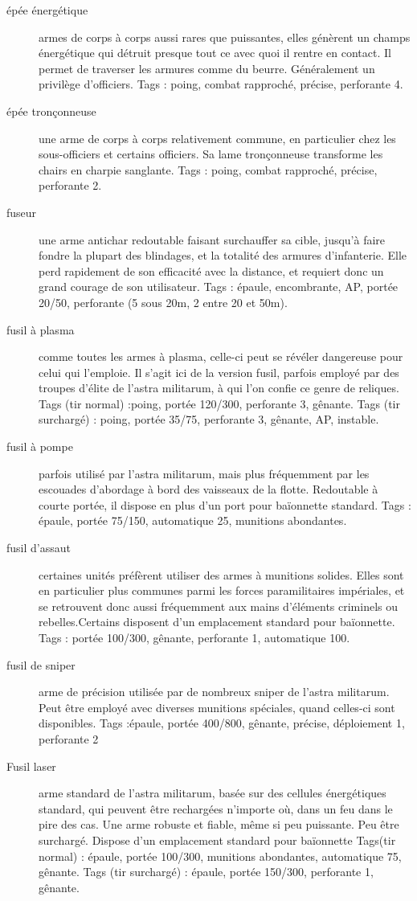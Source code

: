 \documentclass[10pt,a4paper]{article}
\begin{document}
\begin{description}
\item[épée énergétique]armes de corps à corps aussi rares que puissantes, elles génèrent un champs énergétique qui détruit presque tout ce avec quoi il rentre en contact. Il permet de traverser les armures comme du beurre. Généralement un privilège d'officiers. Tags : poing, combat rapproché, précise, perforante 4.
\item[épée tronçonneuse]une arme de corps à corps relativement commune, en particulier chez les sous-officiers et certains officiers. Sa lame tronçonneuse transforme les chairs en charpie sanglante. Tags : poing, combat rapproché, précise, perforante 2.
\item[fuseur]une arme antichar redoutable faisant surchauffer sa cible, jusqu'à faire fondre la plupart des blindages, et la totalité des armures d'infanterie. Elle perd rapidement de son efficacité avec la distance, et requiert donc un grand courage de son utilisateur. Tags : épaule, encombrante, AP, portée 20/50, perforante (5 sous 20m, 2 entre 20 et 50m).
\item[fusil à plasma]comme toutes les armes à plasma, celle-ci peut se révéler dangereuse pour celui qui l'emploie. Il s'agit ici de la version fusil, parfois employé par des troupes d'élite de l'astra militarum, à qui l'on confie ce genre de reliques. Tags (tir normal) :poing, portée 120/300, perforante 3, gênante. Tags (tir surchargé) : poing, portée 35/75, perforante 3, gênante, AP, instable.
\item[fusil à pompe]parfois utilisé par l'astra militarum, mais plus fréquemment par les escouades d'abordage à bord des vaisseaux de la flotte. Redoutable à courte portée, il dispose en plus d'un port pour baïonnette standard. Tags : épaule, portée 75/150, automatique 25, munitions abondantes.
\item[fusil d'assaut ]certaines unités préfèrent utiliser des armes à munitions solides. Elles sont en particulier plus communes parmi les forces paramilitaires impériales, et se retrouvent donc aussi fréquemment aux mains d'éléments criminels ou rebelles.Certains disposent d'un emplacement standard pour baïonnette. Tags : portée 100/300, gênante, perforante 1, automatique 100.
\item[fusil de sniper] arme de précision utilisée par de nombreux sniper de l'astra militarum. Peut être employé avec diverses munitions spéciales, quand celles-ci sont disponibles. Tags :épaule, portée 400/800, gênante, précise, déploiement 1, perforante 2
\item[Fusil laser]arme standard de l'astra militarum, basée sur des cellules énergétiques standard, qui peuvent être rechargées n'importe où, dans un feu dans le pire des cas. Une arme robuste et fiable, même si peu puissante. Peu être surchargé. Dispose d'un emplacement standard pour baïonnette Tags(tir normal) : épaule, portée 100/300, munitions abondantes, automatique 75, gênante. Tags (tir surchargé) : épaule, portée 150/300, perforante 1, gênante.

\end{description}
\end{document}
